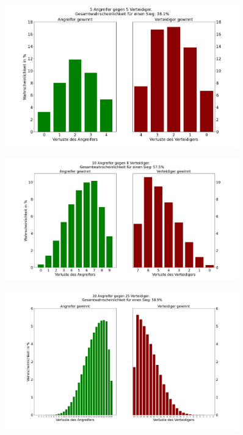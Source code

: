 \documentclass[11pt,a4paper]{article}
\begin{document}
    \begin{figure}[H]
        \centering
        \includegraphics[width=0.9\textwidth]{../images/Risk5v5.png}
    \end{figure}

    \begin{figure}[H]
        \centering
        \includegraphics[width=0.9\textwidth]{../images/Risk10v8.png}
    \end{figure}

    \begin{figure}[H]
        \centering
        \includegraphics[width=0.9\textwidth]{../images/Risk30v25.png}
    \end{figure}
\end{document}
